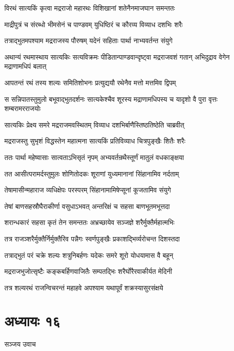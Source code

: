 \twolineshloka
{विरथं सात्यकिं कृत्वा मद्रराजो महारथः}
{विशिखानां शतेनैनमाजघान समन्ततः}


\twolineshloka
{माद्रीपुत्रं च संरब्धो भीमसेनं च पाण्डवम्}
{युधिष्ठिरं च कौरव्य विव्याध दशभिः शरैः}


\twolineshloka
{तत्राद्भुतमपश्याम मद्रराजस्य पौरुषम्}
{यदेनं सहिताः पार्था नाभ्यवर्तन्त संयुगे}


\threelineshloka
{अथान्यं रथमास्थाय सात्यकिः सत्यविक्रमः}
{पीडितान्पाण्डवान्दृष्ट्वा मद्रराजवशं गतान्}
{अभिदुद्राव वेगेन मद्राणामधिपं बलात्}


\twolineshloka
{आपतन्तं रथं तस्य शल्यः समितिशोभनः}
{प्रत्युद्ययौ रथेनैव मत्तो मत्तमिव द्विपम्}


\threelineshloka
{स सन्निपातस्तुमुलो बभूवाद्भुतदर्शनः}
{सात्यकेश्चैव शूरस्य मद्राणामधिपस्य च}
{यादृशो वै पुरा वृत्तः शम्बरामरराजयोः}


\twolineshloka
{सात्यकिः प्रेक्ष्य समरे मद्रराजमवस्थितम्}
{विव्याध दशभिर्बाणैस्तिष्ठतिष्ठेति चाब्रवीत्}


\twolineshloka
{मद्रराजस्तु सुभृशं विद्धस्तेन महात्मना}
{सात्यकिं प्रतिविव्याध चित्रपुङ्खैः शितैः शरैः}


\twolineshloka
{ततः पार्था महेष्वासाः सात्वताऽभिसृतं नृपम्}
{अभ्यवर्तन्रथैस्तूर्णं मातुलं वधकाङ्क्षया}


\twolineshloka
{तत आसीत्परामर्दस्तुमुलः शोणितोदकः}
{शूराणां युध्यमानानां सिंहानामिव नर्दताम्}


\twolineshloka
{तेषामासीन्महाराज व्यधिक्षेपः परस्परम्}
{सिंहानामामिषेप्सूनां कूजतामिव संयुगे}


\twolineshloka
{तेषां बाणसहस्रौघैराकीर्णा वसुधाऽभवत्}
{अन्तरिक्षं च सहसा बाणभूतमभूत्तदा}


\twolineshloka
{शरान्धकारं सहसा कृतं तेन समन्ततः}
{अभ्रच्छायेव सञ्जज्ञे शरैर्मुक्तैर्महात्मभिः}


\twolineshloka
{तत्र राजञ्शरैर्मुक्तैर्निर्मुक्तैरिव पन्नैगः}
{स्वर्णपुङ्खैः प्रकाशद्भिर्व्यरोचन्त दिशस्तदा}


\twolineshloka
{तत्राद्भुतं परं चक्रे शल्यः शत्रुनिबर्हणः}
{यदेकः समरे शूरो योधयामास वै बहून्}


\twolineshloka
{मद्रराजभुजोत्सृष्टैः कङ्कबर्हिणवाजितैः}
{सम्पतद्भिः शरैर्घोरैरवाकीर्यत मेदिनी}


\twolineshloka
{तत्र शल्यरथं राजन्विचरन्तं महाहवे}
{अपश्याम यथापूर्वं शक्रस्यासुरसंक्षये}


\chapter{अध्यायः १६}
\twolineshloka
{सञ्जय उवाच}
{}


